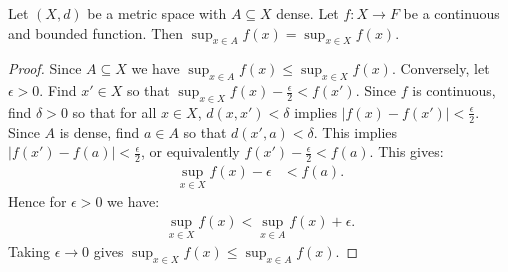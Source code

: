     \begin{proposition}
        Let $(X,d)$ be a metric space with $A \subseteq X$ dense. Let $f:X \rightarrow F$ be a continuous and bounded function. Then $\sup_{x \in A}f(x) = \sup_{x \in X}f(x)$.
    \end{proposition}
        \begin{proof}
            Since $A \subseteq X$ we have $\sup_{x \in A}f(x) \leq \sup_{x \in X}f(x)$. Conversely, let $\epsilon > 0$. Find $x' \in X$ so that $\sup_{x \in X}f(x) - \frac{\epsilon}{2} < f(x')$. Since $f$ is continuous, find $\delta > 0$ so that for all $x \in X$, $d(x,x') < \delta$ implies $|f(x)-f(x')| < \frac{\epsilon}{2}$. Since $A$ is dense, find $a \in A$ so that $d(x',a) < \delta$. This implies $|f(x')-f(a)| < \frac{\epsilon}{2}$, or equivalently $f(x')- \frac{\epsilon}{2} < f(a)$. This gives:
                \begin{equation*}
                \begin{split}
                    \sup_{x \in X}f(x) - \epsilon 
                    & < f(a).
                \end{split}
                \end{equation*}
            Hence for $\epsilon > 0$ we have:
                \begin{equation*}
                \begin{split}
                    \sup_{x \in X}f(x)< \sup_{x \in A}f(x) + \epsilon.
                \end{split}
                \end{equation*}
            Taking $\epsilon \rightarrow 0$ gives $\sup_{x \in X}f(x) \leq \sup_{x \in A}f(x)$.
        \end{proof}

